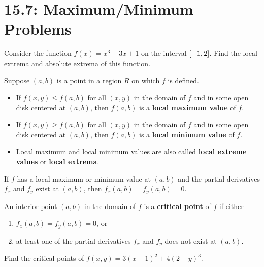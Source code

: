 \documentclass[../mathNotesPreamble]{subfiles}
\begin{document}
\section{15.7: Maximum/Minimum Problems}
  \begin{ex*}
    Consider the function $f(x)=x^3-3x+1$ on the interval ${\left[-1,2\right]}$. Find the local extrema and absolute extrema of this function.
  \end{ex*}

  \begin{defn*}
    Suppose $(a,b)$ is a point in a region $R$ on which $f$ is defined. 
    \begin{itemize}
      \item 
        If $f(x,y)\leq f(a,b)$ for all $(x,y)$ in the domain of $f$ and in some open disk centered at $(a,b)$, then $f(a,b)$ is a \textbf{local maximum value} of $f$.
      \item 
        If $f(x,y)\geq f(a,b)$ for all $(x,y)$ in the domain of $f$ and in some open disk centered at $(a,b)$, then $f(a,b)$ is a \textbf{local minimum value} of $f$.
      \item 
        Local maximum and local minimum values are also called \textbf{local extreme values} or \textbf{local extrema}.
    \end{itemize}
  \end{defn*}
  \pagebreak

  \begin{thmBox*}
    If $f$ has a local maximum or minimum value at $(a,b)$ and the partial derivatives $f_x$ and $f_y$ exist at $(a,b)$, then $f_x(a,b)=f_y(a,b)=0$.
  \end{thmBox*}

  \begin{defn*}
    An interior point $(a,b)$ in the domain of $f$ is a \textbf{critical point} of $f$ if either
    \begin{enumerate}
      \item 
        $f_x(a,b)=f_y(a,b)=0$, or
      \item 
        at least one of the partial derivatives $f_x$ and $f_y$ does not exist at $(a,b)$.
    \end{enumerate}
  \end{defn*}

  \begin{ex*}
    Find the critical points of $f(x,y)=3(x-1)^2+4(2-y)^3$.
  \end{ex*}
\end{document}
